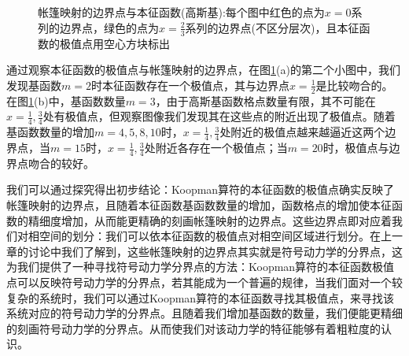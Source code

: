 \begin{figure}[!]
  \centering%
    \\
    \\
    \\
    \\
  \caption[帐篷映射的边界点与本征函数]{帐篷映射的边界点与本征函数(高斯基):每个图中红色的点为$x=0$系列的边界点，绿色的点为$x=\frac{2}{3}$系列的边界点(不区分层次)，且本征函数的极值点用空心方块标出}\label{fig:Tent_eigen_noise_n1000m2d0}
\end{figure}

通过观察本征函数的极值点与帐篷映射的边界点，在图\ref{fig:Tent_eigen_noise_n1000m2d0}(a)的第二个小图中，我们发现基函数$m=2$时本征函数存在一个极值点，其与边界点$x=\frac{1}{2}$是比较吻合的。在图\ref{fig:Tent_eigen_noise_n1000m2d0}(b)中，基函数数量$m=3$，由于高斯基函数格点数量有限，其不可能在$x=\frac{1}{4},\frac{3}{4}$处有极值点，但观察图像我们发现其在这些点的附近出现了极值点。随着基函数数量的增加$m=4,5,8,10$时，$x=\frac{1}{4},\frac{3}{4}$处附近的极值点越来越逼近这两个边界点，当$m=15$时，$x=\frac{1}{4},\frac{3}{4}$处附近各存在一个极值点；当$m=20$时，极值点与边界点吻合的较好。

我们可以通过探究得出初步结论：Koopman算符的本征函数的极值点确实反映了帐篷映射的边界点，且随着本征函数基函数数量的增加，函数格点的增加使本征函数的精细度增加，从而能更精确的刻画帐篷映射的边界点。这些边界点即对应着我们对相空间的划分：我们可以依本征函数的极值点对相空间区域进行划分。在上一章的讨论中我们了解到，这些帐篷映射的边界点其实就是符号动力学的分界点，这为我们提供了一种寻找符号动力学分界点的方法：Koopman算符的本征函数极值点可以反映符号动力学的分界点，若其能成为一个普遍的规律，当我们面对一个较复杂的系统时，我们可以通过Koopman算符的本征函数寻找其极值点，来寻找该系统对应的符号动力学的分界点。且随着我们增加基函数的数量，我们便能更精细的刻画符号动力学的分界点。从而使我们对该动力学的特征能够有着粗粒度的认识。

